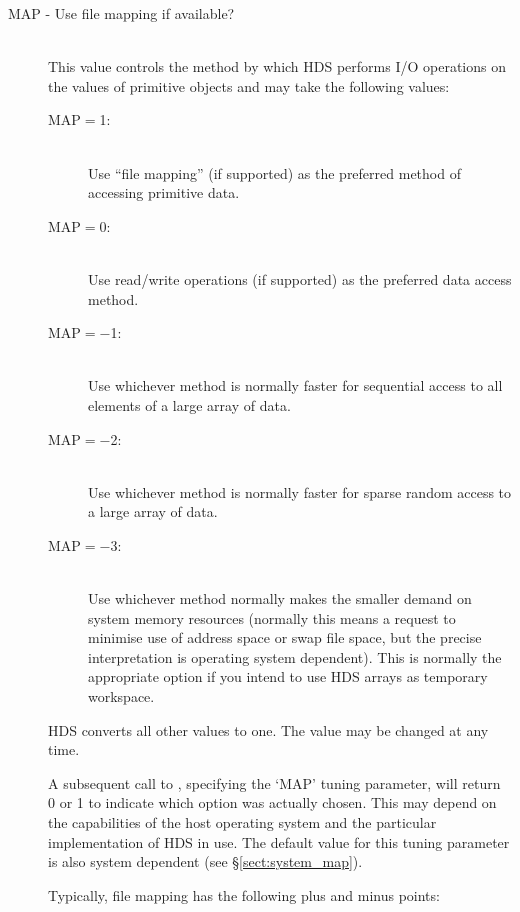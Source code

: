 \documentclass[twoside,11pt]{starlink}
\providecommand{\qt}[1]{``#1''}
\begin{document}
\begin{description}

\item [MAP - Use file mapping if available?]\mbox{}\\
This value controls the method by which HDS performs I/O operations on
the values of primitive objects and may take the following values:

\begin{description}

\item[MAP$=$1:]\mbox{}\\
Use \qt{file mapping} (if supported) as the preferred method of
accessing primitive data.

\item[MAP$=$0:]\mbox{}\\
Use read/write operations (if supported) as the preferred data access
method.

\item[MAP$=-$1:]\mbox{}\\
Use whichever method is normally faster for sequential access to all
elements of a large array of data.

\item[MAP$=-$2:]\mbox{}\\
Use whichever method is normally faster for sparse random access to a
large array of data.

\item[MAP$=-$3:]\mbox{}\\
Use whichever method normally makes the smaller demand on system
memory resources (normally this means a request to minimise use of
address space or swap file space, but the precise interpretation is
operating system dependent). This is normally the appropriate option
if you intend to use HDS arrays as temporary workspace.

\end{description}

HDS converts all other values to one. The value may be changed at any
time.

A subsequent call to , specifying the
`MAP' tuning parameter, will return 0 or 1 to indicate which option
was actually chosen. This may depend on the capabilities of the host
operating system and the particular implementation of HDS in use. The
default value for this tuning parameter is also system dependent (see
\S\ref{sect:system_map}).

Typically, file mapping has the following plus and minus points:


\end{description}
\end{document}
